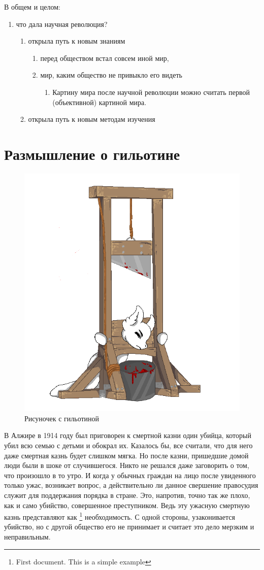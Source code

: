 \documentclass{report}
\begin{document}
В общем и целом:

\begin{enumerate} %
    \item что дала научная революция?
    \begin{enumerate}
        \item  открыла путь к новым знаниям
        \begin{enumerate}
            \item перед обществом встал совсем иной мир, 
   			\item мир, каким общество не привыкло его видеть
            \begin{enumerate}
                \item Картину мира после научной революции можно считать первой (объективной) картиной мира.
            \end{enumerate}
        \end{enumerate}
        \item  открыла путь к новым методам изучения
    \end{enumerate}
    
\end{enumerate}
 


\section{Размышление о гильотине}

\begin{figure}[h]
\centering

\includegraphics[angle=35,origin=c, width=0.3\linewidth]{guillotine.png}
\caption{Рисуночек с гильотиной}
\label{fig:mpr}
\end{figure}

В Алжире в 1914 году был приговорен к смертной казни один убийца, который убил всю семью с детьми и обокрал их. Казалось бы, все считали, что для него даже смертная казнь будет слишком мягка. Но после казни, пришедшие домой люди были в шоке от случившегося. Никто не решался даже заговорить о том, что произошло в то утро. И когда у обычных граждан на лицо после увиденного только ужас, возникает вопрос, а действительно ли данное свершение правосудия служит для поддержания порядка в стране. Это, напротив,
точно так же плохо, как и само убийство, совершенное преступником. Ведь эту ужасную смертную казнь представляют как  \footnote{First document. This is a simple example} необходимость. С одной стороны, узаконивается убийство, но с другой общество его не принимает и считает это дело мерзким и неправильным.
\end{document}
